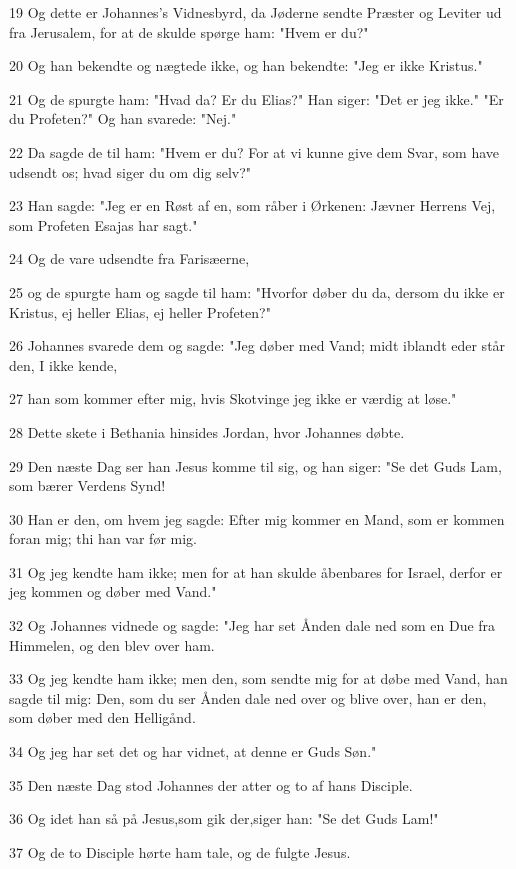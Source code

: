 \par 19 Og dette er Johannes's Vidnesbyrd, da Jøderne sendte Præster og Leviter ud fra Jerusalem, for at de skulde spørge ham: "Hvem er du?"
\par 20 Og han bekendte og nægtede ikke, og han bekendte: "Jeg er ikke Kristus."
\par 21 Og de spurgte ham: "Hvad da? Er du Elias?" Han siger: "Det er jeg ikke." "Er du Profeten?" Og han svarede: "Nej."
\par 22 Da sagde de til ham: "Hvem er du? For at vi kunne give dem Svar, som have udsendt os; hvad siger du om dig selv?"
\par 23 Han sagde: "Jeg er en Røst af en, som råber i Ørkenen: Jævner Herrens Vej, som Profeten Esajas har sagt."
\par 24 Og de vare udsendte fra Farisæerne,
\par 25 og de spurgte ham og sagde til ham: "Hvorfor døber du da, dersom du ikke er Kristus, ej heller Elias, ej heller Profeten?"
\par 26 Johannes svarede dem og sagde: "Jeg døber med Vand; midt iblandt eder står den, I ikke kende,
\par 27 han som kommer efter mig, hvis Skotvinge jeg ikke er værdig at løse."
\par 28 Dette skete i Bethania hinsides Jordan, hvor Johannes døbte.
\par 29 Den næste Dag ser han Jesus komme til sig, og han siger: "Se det Guds Lam, som bærer Verdens Synd!
\par 30 Han er den, om hvem jeg sagde: Efter mig kommer en Mand, som er kommen foran mig; thi han var før mig.
\par 31 Og jeg kendte ham ikke; men for at han skulde åbenbares for Israel, derfor er jeg kommen og døber med Vand."
\par 32 Og Johannes vidnede og sagde: "Jeg har set Ånden dale ned som en Due fra Himmelen, og den blev over ham.
\par 33 Og jeg kendte ham ikke; men den, som sendte mig for at døbe med Vand, han sagde til mig: Den, som du ser Ånden dale ned over og blive over, han er den, som døber med den Helligånd.
\par 34 Og jeg har set det og har vidnet, at denne er Guds Søn."
\par 35 Den næste Dag stod Johannes der atter og to af hans Disciple.
\par 36 Og idet han så på Jesus,som gik der,siger han: "Se det Guds Lam!"
\par 37 Og de to Disciple hørte ham tale, og de fulgte Jesus.
